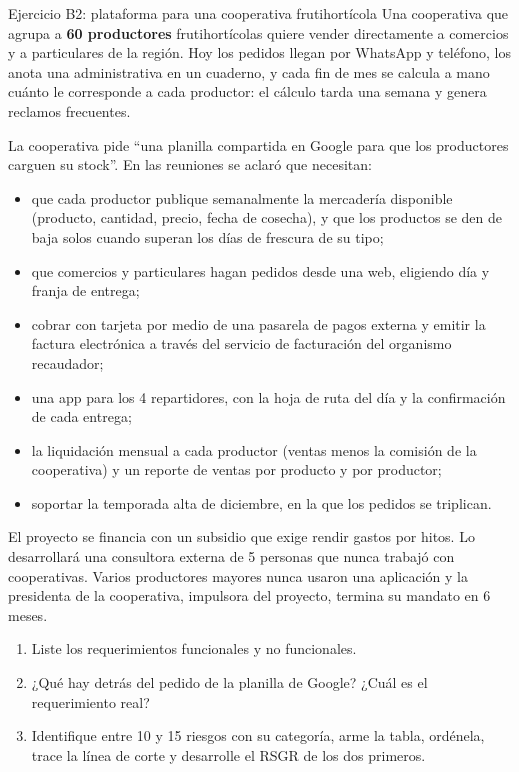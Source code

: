 \documentclass[11pt,a4paper]{article}
\begin{document}
\begin{enunciado}{Ejercicio B2: plataforma para una cooperativa frutihortícola}
\small
Una cooperativa que agrupa a \textbf{60 productores} frutihortícolas quiere vender directamente a comercios y a
particulares de la región. Hoy los pedidos llegan por WhatsApp y teléfono, los anota una administrativa en un
cuaderno, y cada fin de mes se calcula a mano cuánto le corresponde a cada productor: el cálculo tarda una
semana y genera reclamos frecuentes.

La cooperativa pide ``una planilla compartida en Google para que los productores carguen su stock''. En las
reuniones se aclaró que necesitan:
\begin{itemize}
  \item que cada productor publique semanalmente la mercadería disponible (producto, cantidad, precio, fecha de
  cosecha), y que los productos se den de baja solos cuando superan los días de frescura de su tipo;
  \item que comercios y particulares hagan pedidos desde una web, eligiendo día y franja de entrega;
  \item cobrar con tarjeta por medio de una pasarela de pagos externa y emitir la factura electrónica a través
  del servicio de facturación del organismo recaudador;
  \item una app para los 4 repartidores, con la hoja de ruta del día y la confirmación de cada entrega;
  \item la liquidación mensual a cada productor (ventas menos la comisión de la cooperativa) y un reporte de
  ventas por producto y por productor;
  \item soportar la temporada alta de diciembre, en la que los pedidos se triplican.
\end{itemize}
El proyecto se financia con un subsidio que exige rendir gastos por hitos. Lo desarrollará una consultora
externa de 5 personas que nunca trabajó con cooperativas. Varios productores mayores nunca usaron una
aplicación y la presidenta de la cooperativa, impulsora del proyecto, termina su mandato en 6 meses.
\normalsize
\begin{enumerate}[label=\alph*)]
  \item Liste los requerimientos funcionales y no funcionales.
  \item ¿Qué hay detrás del pedido de la planilla de Google? ¿Cuál es el requerimiento real?
  \item Identifique entre 10 y 15 riesgos con su categoría, arme la tabla, ordénela, trace la línea de corte y
  desarrolle el RSGR de los dos primeros.
\end{enumerate}
\end{enunciado}
\end{document}
